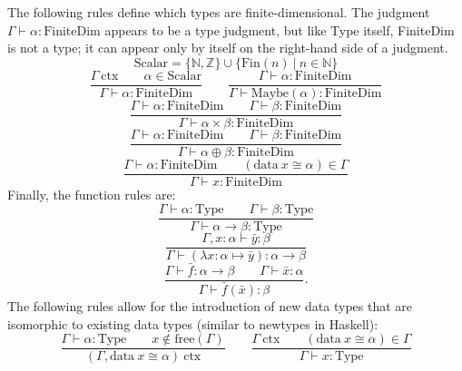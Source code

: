 \documentclass[11pt]{article}
\begin{document}
The following rules define which types are finite-dimensional.
The judgment $\Gamma \vdash \alpha : \text{FiniteDim}$ appears to be
a type judgment, but like Type itself, FiniteDim is not a type; it can appear only
by itself on the right-hand side of a judgment.
\begin{equation}
	\text{Scalar} = \{\mathbb{N}, \mathbb{Z}\} \cup \{\text{Fin}(n)\ |\ n \in \mathbb{N}\}
\end{equation}
\begin{equation}
	\frac{\Gamma\ \text{ctx}
	\qquad \alpha \in \text{Scalar}}
	{\Gamma \vdash \alpha : \text{FiniteDim}}
	\qquad
	\frac{\Gamma \vdash \alpha : \text{FiniteDim}}
	{\Gamma \vdash \text{Maybe}(\alpha) : \text{FiniteDim}}
\end{equation}
\begin{equation}
	\frac{\Gamma \vdash \alpha : \text{FiniteDim}
	\qquad \Gamma \vdash \beta : \text{FiniteDim}}
	{\Gamma \vdash \alpha \times \beta : \text{FiniteDim}}
\end{equation}
\begin{equation}
	\frac{\Gamma \vdash \alpha : \text{FiniteDim}
	\qquad \Gamma \vdash \beta : \text{FiniteDim}}
	{\Gamma \vdash \alpha \oplus \beta : \text{FiniteDim}}
\end{equation}
\begin{equation}
	\frac{\Gamma \vdash \alpha : \text{FiniteDim}
	\qquad (\text{data}\ x \cong \alpha) \in \Gamma}
	{\Gamma \vdash x : \text{FiniteDim}}
\end{equation}
Finally, the function rules are:
\begin{equation}
	\frac{\Gamma \vdash \alpha : \text{Type}
	\qquad \Gamma \vdash \beta : \text{Type}}
	{\Gamma \vdash \alpha \to \beta : \text{Type}}
\end{equation}
\begin{equation}
	\frac{\Gamma, x : \alpha \vdash \bar{y} : \beta}
	{\Gamma \vdash (\lambda x : \alpha \mapsto \bar{y}) : \alpha \to \beta}
\end{equation}
\begin{equation}
	\frac{\Gamma \vdash \bar{f} : \alpha \to \beta
	\qquad \Gamma \vdash \bar{x} : \alpha}
	{\Gamma \vdash \bar{f}(\bar{x}) : \beta}.
\end{equation}
The following rules allow for the introduction of new data types
that are isomorphic to existing data types (similar to newtypes
in Haskell):
\begin{equation}
	\frac{\Gamma \vdash \alpha : \text{Type}
	\qquad x \notin \text{free}(\Gamma)}
	{(\Gamma, \text{data}\ x \cong \alpha)\ \text{ctx}}
	\qquad
	\frac{\Gamma\ \text{ctx}
		\qquad (\text{data}\ x \cong \alpha) \in \Gamma}
		{\Gamma \vdash x : \text{Type}}
\end{equation}
\end{document}
